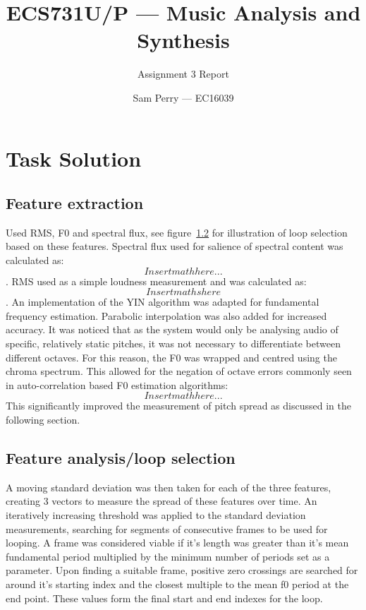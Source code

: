 \documentclass[titlepage]{scrartcl}
\begin{document}
\title{ECS731U/P --- Music Analysis and Synthesis}
\subtitle{\LARGE{Assignment 3 Report}}
\author{Sam Perry --- EC16039}

\maketitle

\section{Task Solution}
\subsection{Feature extraction}
Used RMS, F0 and spectral flux, see figure~\ref{} for illustration of loop
selection based on these features.
Spectral flux used for salience of spectral content was calculated as:
$$ Insert math here...$$.
RMS used as a simple loudness measurement and was calculated as:
$$ Insert maths here $$.
An implementation of the YIN algorithm was adapted for fundamental frequency
estimation. Parabolic interpolation was also added for increased accuracy.
It was noticed that as the system would only be analysing audio of specific,
relatively static pitches, it was not necessary to differentiate between
different octaves. For this reason, the F0 was wrapped and centred using the
chroma spectrum. This allowed for the negation of octave errors commonly seen
in auto-correlation based F0 estimation algorithms:
$$ Insert math here...$$
This significantly improved the measurement of pitch spread as discussed in
the following section.

\subsection{Feature analysis/loop selection}
A moving standard deviation was then taken for each of the three features,
creating 3 vectors to measure the spread of these features over time.
An iteratively increasing threshold was applied to the standard deviation
measurements, searching for segments of consecutive frames to be used for
looping. A frame was considered viable if it's length was greater than it's
mean fundamental period multiplied by the minimum number of periods set as a
parameter. 
Upon finding a suitable frame, positive zero crossings are searched for around
it's starting index and the closest multiple to the mean f0 period at the end
point. These values form the final start and end indexes for the loop.
\end{document}
